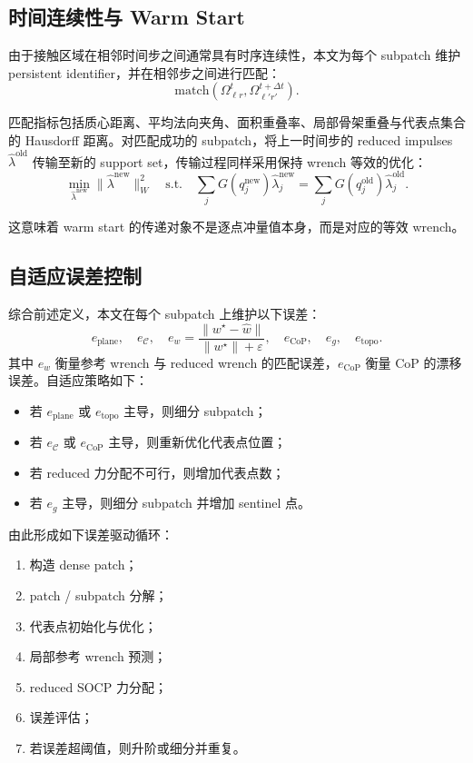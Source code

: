 \documentclass[UTF8,a4paper,11pt]{ctexart}
\begin{document}
\subsection{时间连续性与 Warm Start}

由于接触区域在相邻时间步之间通常具有时序连续性，本文为每个 subpatch 维护 persistent identifier，并在相邻步之间进行匹配：
\begin{equation}
\mathrm{match}(\Omega_{\ell r}^{t}, \Omega_{\ell' r'}^{t+\Delta t}).
\end{equation}

匹配指标包括质心距离、平均法向夹角、面积重叠率、局部骨架重叠与代表点集合的 Hausdorff 距离。对匹配成功的 subpatch，将上一时间步的 reduced impulses $\hat{\lambda}^{\mathrm{old}}$ 传输至新的 support set，传输过程同样采用保持 wrench 等效的优化：
\begin{equation}
\min_{\hat{\lambda}^{\mathrm{new}}}
\|\hat{\lambda}^{\mathrm{new}}\|_W^2
\quad
\text{s.t.}\quad
\sum_j G(q_j^{\mathrm{new}})\hat{\lambda}_j^{\mathrm{new}}
=
\sum_j G(q_j^{\mathrm{old}})\hat{\lambda}_j^{\mathrm{old}}.
\end{equation}

这意味着 warm start 的传递对象不是逐点冲量值本身，而是对应的等效 wrench。

\subsection{自适应误差控制}

综合前述定义，本文在每个 subpatch 上维护以下误差：
\begin{equation}
 e_{\mathrm{plane}},\quad
 e_{\mathcal{C}},\quad
 e_w=
 \frac{\|w^\star-\hat{w}\|}{\|w^\star\|+\varepsilon},\quad
 e_{\mathrm{CoP}},\quad
 e_g,\quad
 e_{\mathrm{topo}}.
\end{equation}
其中 $e_w$ 衡量参考 wrench 与 reduced wrench 的匹配误差，$e_{\mathrm{CoP}}$ 衡量 CoP 的漂移误差。自适应策略如下：
\begin{itemize}[leftmargin=2em]
    \item 若 $e_{\mathrm{plane}}$ 或 $e_{\mathrm{topo}}$ 主导，则细分 subpatch；
    \item 若 $e_{\mathcal{C}}$ 或 $e_{\mathrm{CoP}}$ 主导，则重新优化代表点位置；
    \item 若 reduced 力分配不可行，则增加代表点数；
    \item 若 $e_g$ 主导，则细分 subpatch 并增加 sentinel 点。
\end{itemize}

由此形成如下误差驱动循环：
\begin{enumerate}[label=\arabic*.]
    \item 构造 dense patch；
    \item patch / subpatch 分解；
    \item 代表点初始化与优化；
    \item 局部参考 wrench 预测；
    \item reduced SOCP 力分配；
    \item 误差评估；
    \item 若误差超阈值，则升阶或细分并重复。
\end{enumerate}
\end{document}
